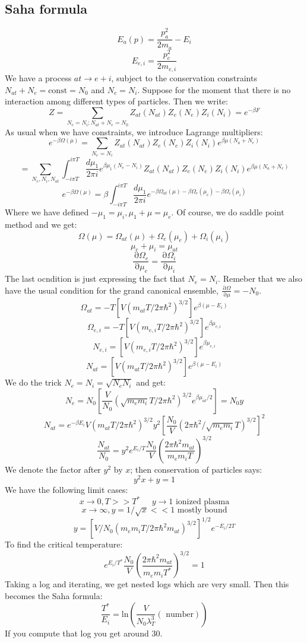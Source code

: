 \documentclass[12 pt]{article}
\DeclareMathOperator {\p} {\partial}
\begin{document}
\subsection*{Saha formula}
\[     E_a (p) = \frac{p_a^2}{2m_a} - E_i   \]
\[    E_{e, i} = \frac{p_e^2}{2m_{e,i}}   \]
We have a process $at\to e + i$, subject to the conservation constraints $N_{at} + N_e = \text{const} = N_0$ and $N_e = N_i$. Suppose for the moment that there is no interaction among different types of particles. Then we write:
\[      Z = \sum_{N_e = N_i ;N_{at} + N_e = N_0 } Z_{at} (N_{at})  Z_{e} (N_{e}) Z_{i} (N_{i})  = e^{-\beta F}    \]
As usual when we have constraints, we introduce Lagrange multipliers:
\[     e^{-\beta \Omega(\mu)} = \sum_{N_e = N_i}  Z_{at} (N_{at})  Z_{e} (N_{e}) Z_{i} (N_{i}) e^{\beta \mu (N_a + N_e)}   \]
\[    = \sum_{N_e, N_i, N_{at}} \int_{-i\pi T}^{i\pi T} \frac{d\mu_1}{2\pi i} e^{\beta \mu_1 (N_e - N_i)}   Z_{at} (N_{at})  Z_{e} (N_{e}) Z_{i} (N_{i}) e^{\beta \mu (N_a + N_e)}    \]
\[      e^{- \beta \Omega(\mu)} = \beta \int_{-i\pi T}^{i\pi T} \frac{d\mu_1}{2\pi i} e^{-\beta \Omega_{at}(\mu)-\beta \Omega_e(\mu_e) - \beta \Omega_i(\mu_i)}      \]
Where we have defined $-\mu_1 = \mu_i, \mu_1 + \mu = \mu_e$. Of course, we do saddle point method and we get:
\[   \Omega(\mu) = \Omega_{at}(\mu) + \Omega_e(\mu_e) + \Omega_i(\mu_i)    \]
\[       \mu_e + \mu_i = \mu_{at}   \]
\[     \frac{\p \Omega_e}{\p \mu_e} = \frac{\p \Omega_i}{\p \mu_i}    \]
The last ocndition is just expressing the fact that $N_e = N_i$. Remeber that we also have the usual condition for the grand canonical ensemble, $\frac{\p \Omega}{\p \mu} = - N_0$.
\[      \Omega_{at} = - T \left[ V (m_{at}T/2\pi \hbar^2)^{3/2} \right] e^{\beta(\mu - E_i)}   \]
\[      \Omega_{e,i} = - T \left[ V (m_{e,i}T/2\pi \hbar^2)^{3/2} \right] e^{\beta \mu_{e,i}}   \]
\[    N_{e,i} =   \left[ V (m_{e,i}T/2\pi \hbar^2)^{3/2} \right] e^{\beta \mu_{e,i}}   \]
\[      N_{at} =   \left[ V (m_{at}T/2\pi \hbar^2)^{3/2} \right] e^{\beta(\mu - E_i)}   \]
We do the trick $N_e = N_i = \sqrt{N_e N_i}$ and get:
\[     N_e = N_0 \left[ \frac{V}{N_0}  (\sqrt{m_e m_i}T/2\pi \hbar^2)^{3/2} e^{\beta \mu_{at} /2} \right]    = N_0 y   \]
\[    N_{at} = e^{-\beta E_i}  V (m_{at}T/2\pi \hbar^2)^{3/2} y^2 \left[  \frac{N_0}{V} (2\pi \hbar^2 / \sqrt{m_em_i} T)^{3/2} \right]^2   \]
\[    \frac{N_{at}}{N_0} = y^2 e^{E_i/T}  \frac{N_0}{V} \left( \frac{2\pi \hbar^2 m_{at}}{m_e m_i T}  \right)^{3/2}   \]
We denote the factor after $y^2$ by $x$; then conservation of particles says:
\[    y^2 x + y = 1      \]
We have the following limit cases:
\[      x\to 0, T>> T^* \;\;\;\;\; y\to 1 \text{ ionized plasma}    \]
\[      x \to \infty, y = 1/\sqrt{x} <<1 \text{ mostly bound}          \]
\[      y =  \left[  V/N_0 (m_e m_i T/2\pi \hbar^2 m_{at})^{3/2} \right]^{1/2}  e^{-E_i/2T}  \]
To find the critical temperature:
\[        e^{E_i/T^*}  \frac{N_0}{V} \left( \frac{2\pi \hbar^2 m_{at}}{m_e m_i T^*}  \right)^{3/2}  = 1         \]
Taking a log and iterating, we get nested logs which are very small. Then this becomes the Saha formula:
\[       \frac{T^*}{E_i} = \text{ln} \left( \frac{V}{N_0 \lambda_T^3} (\text{ number})  \right)     \]
If you compute that log you get around 30.
\end{document}
